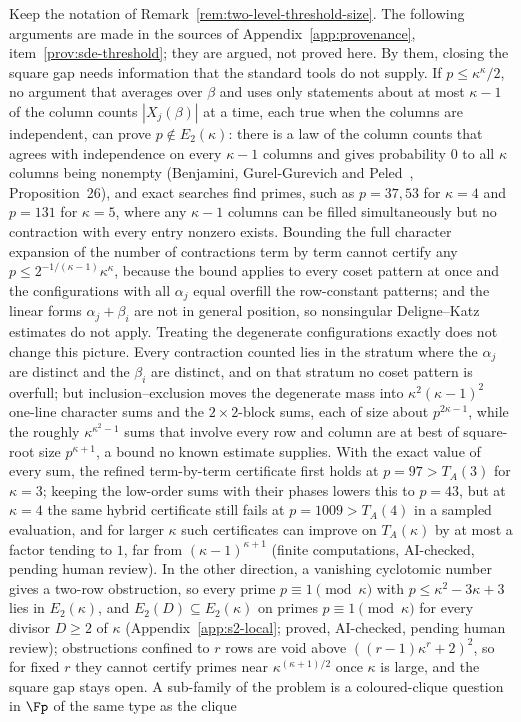 \begin{remark}
\label{rem:sde-side-barrier}
Keep the notation of Remark~\ref{rem:two-level-threshold-size}. The following arguments are made in the sources of Appendix~\ref{app:provenance}, item~\ref{prov:sde-threshold}; they are argued, not proved here. By them, closing the square gap needs information that the standard tools do not supply. If $p \le \kappa^\kappa/2$, no argument that averages over $\beta$ and uses only statements about at most $\kappa-1$ of the column counts $|X_j(\beta)|$ at a time, each true when the columns are independent, can prove $p \notin E_2(\kappa)$: there is a law of the column counts that agrees with independence on every $\kappa-1$ columns and gives probability $0$ to all $\kappa$ columns being nonempty (Benjamini, Gurel-Gurevich and Peled~\cite{BenjaminiGurelGurevichPeled2012}, Proposition~26), and exact searches find primes, such as $p = 37, 53$ for $\kappa = 4$ and $p = 131$ for $\kappa = 5$, where any $\kappa-1$ columns can be filled simultaneously but no contraction with every entry nonzero exists. Bounding the full character expansion of the number of contractions term by term cannot certify any $p \le 2^{-1/(\kappa-1)}\kappa^\kappa$, because the bound applies to every coset pattern at once and the configurations with all $\alpha_j$ equal overfill the row-constant patterns; and the linear forms $\alpha_j + \beta_i$ are not in general position, so nonsingular Deligne--Katz estimates do not apply. Treating the degenerate configurations exactly does not change this picture. Every contraction counted lies in the stratum where the $\alpha_j$ are distinct and the $\beta_i$ are distinct, and on that stratum no coset pattern is overfull; but inclusion--exclusion moves the degenerate mass into $\kappa^2(\kappa-1)^2$ one-line character sums and the $2\times2$-block sums, each of size about $p^{2\kappa-1}$, while the roughly $\kappa^{\kappa^2-1}$ sums that involve every row and column are at best of square-root size $p^{\kappa+1}$, a bound no known estimate supplies. With the exact value of every sum, the refined term-by-term certificate first holds at $p = 97 > T_A(3)$ for $\kappa = 3$; keeping the low-order sums with their phases lowers this to $p = 43$, but at $\kappa = 4$ the same hybrid certificate still fails at $p = 1009 > T_A(4)$ in a sampled evaluation, and for larger $\kappa$ such certificates can improve on $T_A(\kappa)$ by at most a factor tending to $1$, far from $(\kappa-1)^{\kappa+1}$ (finite computations, AI-checked, pending human review). In the other direction, a vanishing cyclotomic number gives a two-row obstruction, so every prime $p \equiv 1 \pmod\kappa$ with $p \le \kappa^2 - 3\kappa + 3$ lies in $E_2(\kappa)$, and $E_2(D) \subseteq E_2(\kappa)$ on primes $p \equiv 1 \pmod\kappa$ for every divisor $D \ge 2$ of $\kappa$ (Appendix~\ref{app:s2-local}; proved, AI-checked, pending human review); obstructions confined to $r$ rows are void above $((r-1)\kappa^r+2)^2$, so for fixed $r$ they cannot certify primes near $\kappa^{(\kappa+1)/2}$ once $\kappa$ is large, and the square gap stays open. A sub-family of the problem is a coloured-clique question in $\Fp$ of the same type as the clique 
\end{remark}
